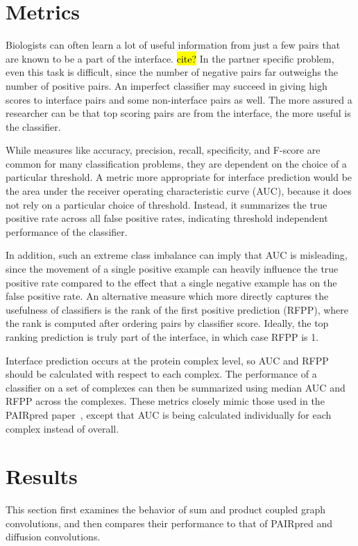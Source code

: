 \section{Metrics}

Biologists can often learn a lot of useful information from just a few pairs that are known to be a part of the interface. \hl{cite?}
In the partner specific problem, even this task is difficult, since the number of negative pairs far outweighs the number of positive pairs.
An imperfect classifier may succeed in giving high scores to interface pairs and some non-interface pairs as well.
The more assured a researcher can be that top scoring pairs are from the interface, the more useful is the classifier.

While measures like accuracy, precision, recall, specificity, and F-score are common for many classification problems, they are dependent on the choice of a particular threshold.
A metric more appropriate for interface prediction would be the area under the receiver operating characteristic curve (AUC), because it does not rely on a particular choice of threshold.
Instead, it summarizes the true positive rate across all false positive rates, indicating threshold independent performance of the classifier.

In addition, such an extreme class imbalance can imply that AUC is misleading, since the movement of a single positive example can heavily influence the true positive rate compared to the effect that a single negative example has on the false positive rate.
An alternative measure which more directly captures the usefulness of classifiers is the rank of the first positive prediction (RFPP), where the rank is computed after ordering pairs by classifier score.
Ideally, the top ranking prediction is truly part of the interface, in which case RFPP is 1.

Interface prediction occurs at the protein complex level, so AUC and RFPP should be calculated with respect to each complex. 
The performance of a classifier on a set of complexes can then be summarized using median AUC and RFPP across the complexes.
These metrics closely mimic those used in the PAIRpred paper~\cite{minhas2014}, except that AUC is being calculated individually for each complex instead of overall.

\section{Results}

This section first examines the behavior of sum and product coupled graph convolutions, and then compares their performance to that of PAIRpred and diffusion convolutions.

